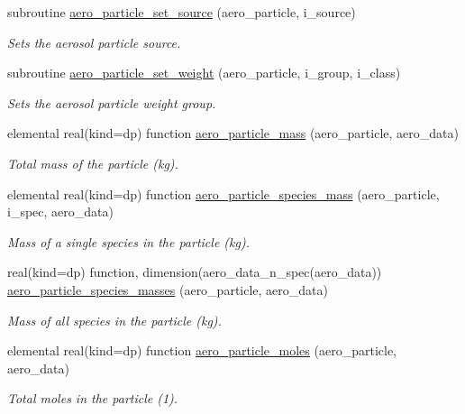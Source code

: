 \begin{DoxyCompactItemize}
subroutine \mbox{\hyperlink{namespacepmc__aero__particle_aa8098a7e82dde71488ac2f4b69dd537c}{aero\+\_\+particle\+\_\+set\+\_\+source}} (aero\+\_\+particle, i\+\_\+source)
\begin{DoxyCompactList}\small\item\em Sets the aerosol particle source. \end{DoxyCompactList}\item 
subroutine \mbox{\hyperlink{namespacepmc__aero__particle_a2d9b838fc6ab2c7a82277a5e4d96f80f}{aero\+\_\+particle\+\_\+set\+\_\+weight}} (aero\+\_\+particle, i\+\_\+group, i\+\_\+class)
\begin{DoxyCompactList}\small\item\em Sets the aerosol particle weight group. \end{DoxyCompactList}\item 
elemental real(kind=dp) function \mbox{\hyperlink{namespacepmc__aero__particle_a2eb5867602c52d2c78e2780b53e50fa5}{aero\+\_\+particle\+\_\+mass}} (aero\+\_\+particle, aero\+\_\+data)
\begin{DoxyCompactList}\small\item\em Total mass of the particle (kg). \end{DoxyCompactList}\item 
elemental real(kind=dp) function \mbox{\hyperlink{namespacepmc__aero__particle_a00b00ef036460b7f4dea8d7f07631d41}{aero\+\_\+particle\+\_\+species\+\_\+mass}} (aero\+\_\+particle, i\+\_\+spec, aero\+\_\+data)
\begin{DoxyCompactList}\small\item\em Mass of a single species in the particle (kg). \end{DoxyCompactList}\item 
real(kind=dp) function, dimension(aero\+\_\+data\+\_\+n\+\_\+spec(aero\+\_\+data)) \mbox{\hyperlink{namespacepmc__aero__particle_a1aac7400fd1b12f736d460c540c8ae0f}{aero\+\_\+particle\+\_\+species\+\_\+masses}} (aero\+\_\+particle, aero\+\_\+data)
\begin{DoxyCompactList}\small\item\em Mass of all species in the particle (kg). \end{DoxyCompactList}\item 
elemental real(kind=dp) function \mbox{\hyperlink{namespacepmc__aero__particle_ad49b8be44f56a4b92ca2c1e589d33e3f}{aero\+\_\+particle\+\_\+moles}} (aero\+\_\+particle, aero\+\_\+data)
\begin{DoxyCompactList}\small\item\em Total moles in the particle (1). \end{DoxyCompactList}\item 

\end{DoxyCompactItemize}
